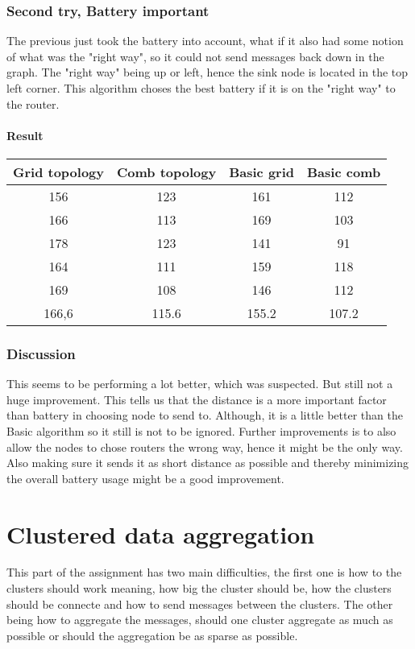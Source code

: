 \documentclass{article}
\begin{document}
\section{Second try, Battery important}
  The previous just took the battery into account, what if it also had
  some notion of what was the "right way", so it could not send messages
  back down in the graph. The "right way" being up or left, hence the sink
  node is located in the top left corner. This algorithm choses the best
  battery if it is on the "right way" to the router.
  \subsection{Result}
    \begin{tabular}{c|c||c|c}
      Grid topology & Comb topology & Basic grid & Basic comb\\
      \hline
      \hline
      156 & 123 & 161 & 112\\
      166 & 113 & 169 & 103\\
      178 & 123 & 141 & 91 \\
      164 & 111 & 159 & 118\\
      169 & 108 & 146 & 112\\
      \hline
      166,6&115.6&155.2&107.2\\
    \end{tabular}
    \section{Discussion}
     This seems to be performing a lot better, which was suspected. But still not a huge
     improvement. This tells us that the distance is a more important factor than battery
     in choosing node to send to. Although, it is a little better than the Basic algorithm
     so it still is not to be ignored.
     Further improvements is to also allow the nodes to chose routers the wrong way, hence 
     it might be the only way. Also making sure it sends it as short distance as possible
     and thereby minimizing the overall battery usage might be a good improvement.
     
\part{Clustered data aggregation}
  This part of the assignment has two main difficulties, the first one is 
  how to the clusters should work meaning, how big the cluster should be, how the clusters
  should be connecte and how to send messages between the clusters.
  The other being how to aggregate the messages, should one cluster aggregate as much
  as possible or should the aggregation be as sparse as possible.
\end{document}
